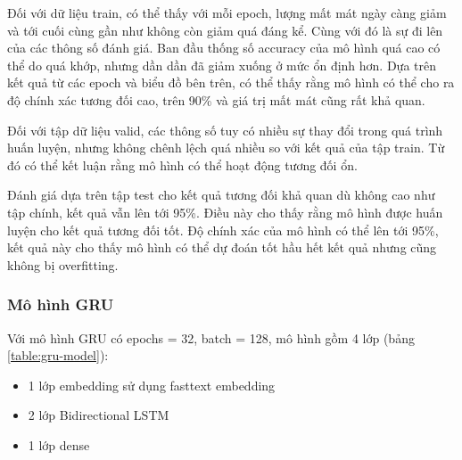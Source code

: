 Đối với dữ liệu train, có thể thấy với mỗi epoch, lượng mất mát ngày càng giảm và tới cuối cùng gần như không còn giảm quá đáng kể. Cùng với đó là sự đi lên của các thông số đánh giá. Ban đầu thống số accuracy của mô hình quá cao có thể do quá khớp, nhưng dần dần đã giảm xuống ở mức ổn định hơn. Dựa trên kết quả từ các epoch và biểu đồ bên trên, có thể thấy rằng mô hình có thể cho ra độ chính xác tương đối cao, trên 90\% và giá trị mất mát cũng rất khả quan.

Đối với tập dữ liệu valid, các thông số tuy có nhiều sự thay đổi trong quá trình huấn luyện, nhưng không chênh lệch quá nhiều so với kết quả của tập train. Từ đó có thể kết luận rằng mô hình có thể hoạt động tương đối ổn.

Đánh giá dựa trên tập test cho kết quả tương đối khả quan dù không cao như tập chính, kết quả vẫn lên tới 95\%. Điều này cho thấy rằng mô hình được huấn luyện cho kết quả tương đối tốt. Độ chính xác của mô hình có thể lên tới 95\%, kết quả này cho thấy mô hình có thể dự đoán tốt hầu hết kết quả nhưng cũng không bị overfitting.

\subsubsection{Mô hình GRU}
Với mô hình GRU có epochs = 32, batch = 128, mô hình gồm 4 lớp (bảng \ref{table:gru-model}):
\begin{itemize}
    \item 1 lớp embedding sử dụng fasttext embedding
    \item 2 lớp Bidirectional LSTM
    \item 1 lớp dense
\end{itemize}

